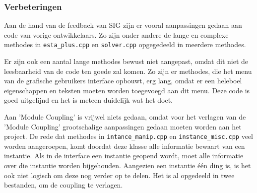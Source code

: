 \subsubsection{Verbeteringen}
Aan de hand van de feedback van SIG zijn er vooral aanpassingen gedaan aan code van vorige ontwikkelaars. Zo zijn onder andere de lange en complexe methodes in \texttt{esta\_plus.cpp} en \texttt{solver.cpp} opgegedeeld in meerdere methodes. 

Er zijn ook een aantal lange methodes bewust niet aangepast, omdat dit niet de leesbaarheid van de code ten goede zal komen. Zo zijn er methodes, die het menu van de grafische gebruikers interface opbouwt, erg lang, omdat er een heleboel eigenschappen en teksten moeten worden toegevoegd aan dit menu. Deze code is goed uitgelijnd en het is meteen duidelijk wat het doet. 

Aan 'Module Coupling' is vrijwel niets gedaan, omdat voor het verlagen van de 'Module Coupling' grootschalige aanpassingen gedaan moeten worden aan het project. De rede dat methodes in \texttt{intance\_manip.cpp} en \texttt{instance\_misc.cpp} veel worden aangeroepen, komt doordat deze klasse alle informatie bewaart van een instantie. Als in de interface een instantie geopend wordt, moet alle informatie over die instantie worden bijgehouden. Aangezien een instantie \'e\'en ding is, is het ook niet logisch om deze nog verder op te delen. Het is al opgedeeld in twee bestanden, om de coupling te verlagen.
